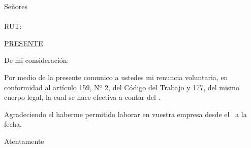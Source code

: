 \documentclass{letter}
\begin{document}
\begin{letter}{Señores \\ \nombreEmpresa \\ RUT: \rutEmpresa \\ \direccionEmpresa}
\opening{\underline{PRESENTE}}

De mi consideración:

Por medio de la presente comunico a ustedes mi renuncia voluntaria, en conformidad al artículo 159, Nº 2, del Código del Trabajo y 177, del mismo cuerpo legal, la cual se hace efectiva a contar del \ultimoDia.

Agradeciendo el haberme permitido laborar en vuestra empresa desde el \fechaIngreso\ a la fecha.

\closing{Atentamente}

\end{letter}
\end{document}
